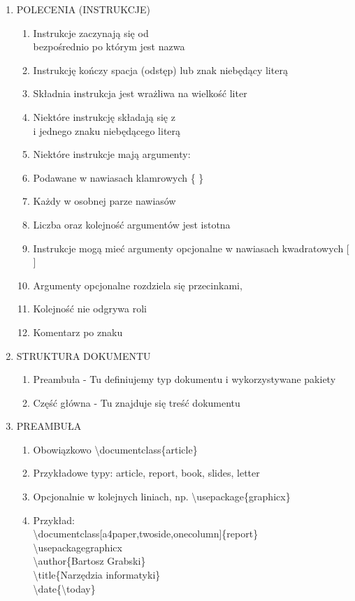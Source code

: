\documentclass[a4paper,twoside,onecolumn]{report}
\begin{document}
\begin{enumerate}
			\item POLECENIA (INSTRUKCJE)
			\begin{enumerate}
				\item Instrukcje zaczynają się od \\ bezpośrednio po którym jest nazwa
				\item Instrukcję kończy spacja (odstęp) lub znak niebędący literą
				\item Składnia instrukcja jest wrażliwa na wielkość liter
				\item Niektóre instrukcję składają się z \\ i jednego znaku niebędącego literą
				\item Niektóre instrukcje mają argumenty:
				\item Podawane w nawiasach klamrowych \{ \}
				\item Każdy w osobnej parze nawiasów
				\item Liczba oraz kolejność argumentów jest istotna
				\item Instrukcje mogą mieć argumenty opcjonalne w nawiasach kwadratowych [ ]
				\item Argumenty opcjonalne rozdziela się przecinkami,
				\item Kolejność nie odgrywa roli
				\item Komentarz po znaku %
			\end{enumerate}

			\item STRUKTURA DOKUMENTU
			\begin{enumerate}
				\item Preambuła - Tu definiujemy typ dokumentu i wykorzystywane pakiety
				\item Część główna - Tu znajduje się treść dokumentu
			\end{enumerate}

			\item PREAMBUŁA
			\begin{enumerate}
				\item Obowiązkowo \textbackslash documentclass\{article\}
				\item Przykładowe typy: article, report, book, slides, letter
				\item Opcjonalnie w kolejnych liniach, np.  \textbackslash usepackage\{graphicx\}
				\item Przykład:\\
					\textbackslash documentclass[a4paper,twoside,onecolumn]\{report\} \\
					\textbackslash usepackage{graphicx} \\
					\textbackslash author\{Bartosz Grabski\} \\
					\textbackslash title\{Narzędzia informatyki\} \\
					\textbackslash date\{\textbackslash today\} \\
			\end{enumerate}


\end{enumerate}
\end{document}
